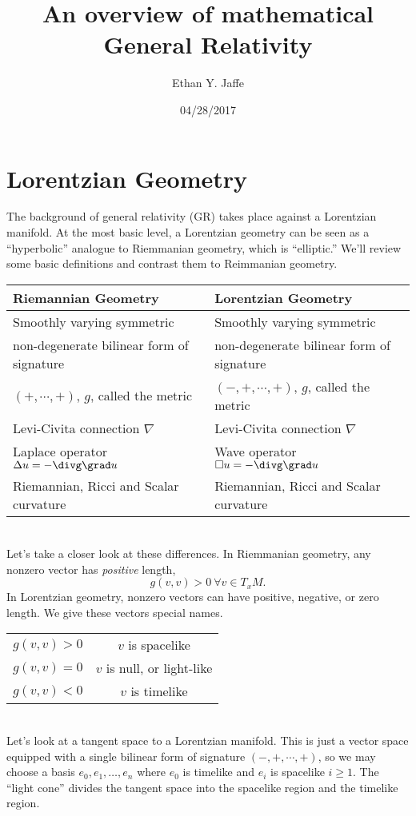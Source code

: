 \documentclass[12pt]{article}
\title{An overview of mathematical General Relativity}
\author{Ethan Y. Jaffe}
\date{04/28/2017}
\begin{document}
\maketitle
{}
\section{Lorentzian Geometry}
The background of general relativity (GR) takes place against a Lorentzian manifold. At the most basic level, a Lorentzian geometry can be seen as a ``hyperbolic'' analogue to Riemmanian geometry, which is ``elliptic.'' We'll review some basic definitions and contrast them to Reimmanian geometry.

\begin{tabular}{l | l}
Riemannian Geometry & Lorentzian Geometry\\
\hline
Smoothly varying symmetric & Smoothly varying symmetric  \\
non-degenerate  bilinear form  of signature& non-degenerate  bilinear form of signature\\
 $(+,\cdots,+)$, $g$, called the metric  &  $(-,+,\cdots,+)$, $g$, called the metric\\
Levi-Civita connection $\nabla$ & Levi-Civita connection $\nabla$\\
Laplace operator $\Delta u = -\divg \grad u$ & Wave operator $\Box u = -\divg \grad u$\\
Riemannian, Ricci and Scalar curvature & Riemannian, Ricci and Scalar curvature
\end{tabular}\\[2ex]

Let's take a closer look at these differences. In Riemmanian geometry, any nonzero vector has \emph{positive} length,
\[g(v,v)  > 0 \ \forall v \in T_xM.\]
In Lorentzian geometry, nonzero vectors can have positive, negative, or zero length. We give these vectors special names.

\begin{tabular}{c | c}
$g(v,v) > 0$ & $v$ is spacelike\\
$g(v,v) = 0$ & $v$ is null, or light-like\\
$g(v,v) < 0$ & $v$ is timelike\end{tabular}\\[2ex]

Let's look at a tangent space to a Lorentzian manifold. This is just a vector space equipped with a single bilinear form of signature $(-,+,\cdots,+)$, so we may choose a basis $e_0,e_1,\ldots,e_n$ where $e_0$ is timelike and $e_i$ is spacelike $i \geq 1$. The ``light cone'' divides the tangent space into the spacelike region and the timelike region.
\end{document}
